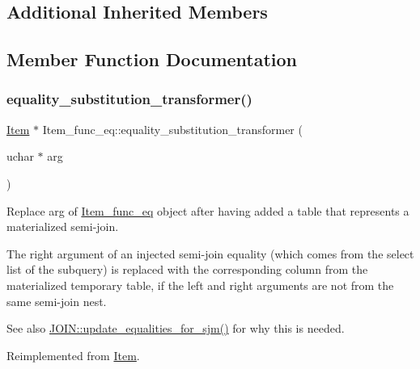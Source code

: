 \subsection*{Additional Inherited Members}


\subsection{Member Function Documentation}
\mbox{\label{classItem__func__eq_ac77ed08d8277717b04bf0878069cb25a}} 
\subsubsection{\texorpdfstring{equality\+\_\+substitution\+\_\+transformer()}{equality\_substitution\_transformer()}}
{\footnotesize\ttfamily \mbox{\hyperlink{classItem}{Item}} $\ast$ Item\+\_\+func\+\_\+eq\+::equality\+\_\+substitution\+\_\+transformer (\begin{DoxyParamCaption}\item[{uchar $\ast$}]{arg }\end{DoxyParamCaption})\hspace{0.3cm}{\ttfamily [virtual]}}

Replace arg of \mbox{\hyperlink{classItem__func__eq}{Item\+\_\+func\+\_\+eq}} object after having added a table that represents a materialized semi-\/join.

The right argument of an injected semi-\/join equality (which comes from the select list of the subquery) is replaced with the corresponding column from the materialized temporary table, if the left and right arguments are not from the same semi-\/join nest. \begin{DoxySeeAlso}{See also}
\mbox{\hyperlink{group__Query__Optimizer_gaeaa6edcfa6c4d934dd42d505d9de2fef}{J\+O\+I\+N\+::update\+\_\+equalities\+\_\+for\+\_\+sjm()}} for why this is needed. 
\end{DoxySeeAlso}


Reimplemented from \mbox{\hyperlink{classItem}{Item}}.

\mbox{\label{classItem__func__eq_a085a3e6f03cf5e3915949e4f6bc9f53c}} 
